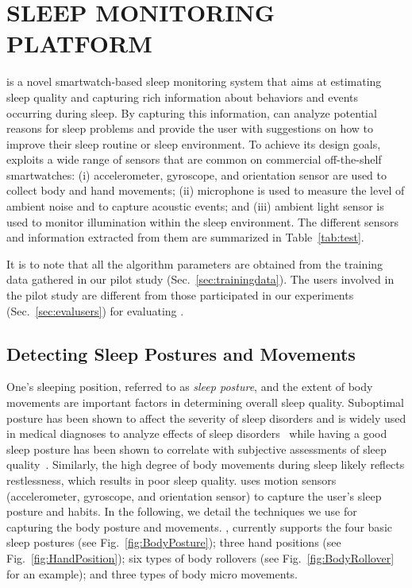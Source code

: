 \section{{\systemname} SLEEP MONITORING PLATFORM}\label{Sec:2design}

{\systemname} is a novel smartwatch-based sleep monitoring system that aims at estimating sleep quality and capturing rich information
about behaviors and events occurring during sleep. By capturing this information, {\systemname} can analyze potential reasons for sleep
problems and provide the user with suggestions on how to improve their sleep routine or sleep environment. To achieve its design goals,
{\systemname} exploits a wide range of sensors that are common on commercial off-the-shelf smartwatches: (i) accelerometer, gyroscope, and
orientation sensor are used to collect body and hand movements; (ii) microphone is used to measure the level of ambient noise and to
capture acoustic events; and (iii) ambient light sensor is used to monitor illumination within the sleep environment. The different sensors
and information extracted from them are summarized in Table~\ref{tab:test}.

It is to note that all the algorithm parameters are obtained from the training data gathered in our pilot study
(Sec.~\ref{sec:trainingdata}). The users involved in the pilot study are different from those participated in our experiments
(Sec.~\ref{sec:evalusers}) for evaluating \systemname.


\subsection{Detecting Sleep Postures and Movements}

One's sleeping position, referred to as {\em sleep posture}, and the extent of body movements are important factors in determining overall
sleep quality. Suboptimal posture has been shown to affect the severity of sleep disorders and is widely used in medical diagnoses to
analyze effects of sleep disorders~\cite{oksenberg1998effect,eiseman2012impact} while having a good sleep posture has been shown to
correlate with subjective assessments of sleep quality~\cite{dekoninck83sleep}. Similarly, the high degree of body movements during sleep
likely reflects restlessness, which results in poor sleep quality. {\systemname} uses motion sensors (accelerometer, gyroscope, and
orientation sensor) to capture the user's sleep posture and habits. In the following, we detail the techniques we use for capturing the
body posture and movements.  {\systemname}, currently supports the four basic sleep postures (see Fig.~\ref{fig:BodyPosture}); three hand
positions (see Fig.~\ref{fig:HandPosition}); six types of body rollovers (see Fig.~\ref{fig:BodyRollover} for an example); and three types
of body micro movements.

